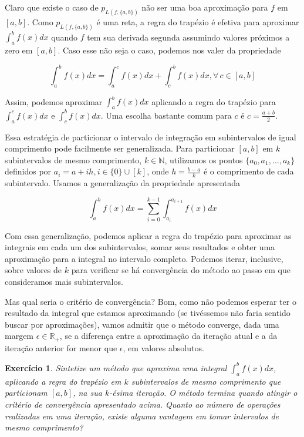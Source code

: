 \documentclass[]{article}
\newtheorem{exercicio}{Exercício}
\numberwithin{equation}{section}
\begin{document}
Claro que existe o caso de $p_{L(f, \{a, b\})}$ não ser uma boa aproximação para $f$ em $[a, b]$. Como $p_{L(f, \{a, b\})}$ é uma reta, a regra do trapézio é efetiva para aproximar $\int_{a}^{b} f(x) dx$ quando $f$ tem sua derivada segunda assumindo valores próximos a zero em $[a, b]$. Caso esse não seja o caso, podemos nos valer da propriedade

$$
\int_{a}^{b} f(x) dx = \int_{a}^{c} f(x) dx + \int_{c}^{b} f(x) dx, \forall\, c \in [a, b]
$$

Assim, podemos aproximar $\int_{a}^{b} f(x) dx$ aplicando a regra do trapézio para $\int_{a}^{c} f(x) dx$ e $\int_{c}^{b} f(x) dx$. Uma escolha bastante comum para $c$ é $c = \frac{a + b}{2}$.

Essa estratégia de particionar o intervalo de integração em subintervalos de igual comprimento pode facilmente ser generalizada. Para particionar $[a, b]$ em $k$ subintervalos de mesmo comprimento, $k \in \mathbb{N}$, utilizamos os pontos $\{a_0, a_1, \dots, a_k\}$ definidos por $a_i = a + ih, i \in \{0\} \cup [k]$, onde $h = \frac{b - a}{k}$ é o comprimento de cada subintervalo. Usamos a generalização da propriedade apresentada

$$
\int_{a}^{b} f(x) dx = \sum_{i = 0}^{k - 1} \int_{a_i}^{a_{i + 1}} f(x) dx
$$

Com essa generalização, podemos aplicar a regra do trapézio para aproximar as integrais em cada um dos subintervalos, somar seus resultados e obter uma aproximação para a integral no intervalo completo. Podemos iterar, inclusive, sobre valores de $k$ para verificar se há convergência do método ao passo em que consideramos mais subintervalos.

Mas qual seria o critério de convergência? Bom, como não podemos esperar ter o resultado da integral que estamos aproximando (se tivéssemos não faria sentido buscar por aproximações), vamos admitir que o método converge, dada uma margem $\epsilon \in \mathbb{R}_+$, se a diferença entre a aproximação da iteração atual e a da iteração anterior for menor que $\epsilon$, em valores absolutos.

\begin{exercicio} \label{exercicioRegraTrapezioImplementacao}
	Sintetize um método que aproxima uma integral $\int_{a}^{b} f(x) dx$, aplicando a regra do trapézio em $k$ subintervalos de mesmo comprimento que particionam $[a, b]$, na sua $k$-ésima iteração. O método termina quando atingir o critério de convergência apresentado acima. Quanto ao número de operações realizadas em uma iteração, existe alguma vantagem em tomar intervalos de mesmo comprimento?
\end{exercicio}
\end{document}
